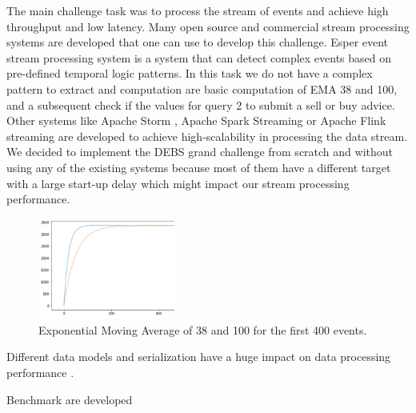 The main challenge task was to process the stream of events and achieve high throughput and low latency. 
Many open source and commercial stream processing systems are developed that one can use to develop this challenge. 
Esper event stream processing system \cite{Bernhardt2007} is a system that can detect complex events based on pre-defined temporal logic patterns. 
In this task we do not have a complex pattern to extract and computation are basic computation of EMA 38 and 100, and a subsequent check if the values for 
query 2 to submit a sell or buy advice. Other systems like Apache Storm \cite{8288619}, Apache Spark Streaming \cite{zaharia2010spark} or 
Apache Flink streaming \cite{alexandrov2014stratosphere} are developed to achieve high-scalability in processing the data stream. 
We decided to implement the DEBS grand challenge from scratch and without using any of the existing systems because most of them 
have a different target with a large start-up delay which might impact our stream processing performance. 


\begin{figure}[!ht]
    \begin{center}
        \includegraphics[width=0.4\textwidth]{./images/query2_example_200.png}
        \caption{Exponential Moving Average of 38 and 100 for the first 400 events.}
        \label{fig:EMA200}
    \end{center}
\end{figure}










Different data models and serialization have a huge impact on data processing performance \cite{DBLP:conf/cloud/SikdarTJ17}. 

Benchmark are developed \cite{DBLP:conf/cloud/SikdarTJ17} \cite{8701904}